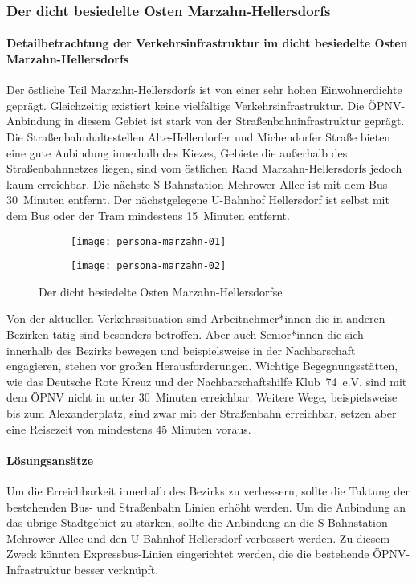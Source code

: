 \subsubsection{Der dicht besiedelte Osten Marzahn-Hellersdorfs}
\paragraph{Detailbetrachtung der Verkehrsinfrastruktur im dicht besiedelte Osten Marzahn-Hellersdorfs}
Der östliche Teil Marzahn-Hellersdorfs ist von einer sehr hohen Einwohnerdichte geprägt. Gleichzeitig existiert keine vielfältige Verkehrsinfrastruktur. Die ÖPNV-Anbindung in diesem Gebiet ist stark von der Straßenbahninfrastruktur geprägt. Die Straßenbahnhaltestellen Alte-Hellerdorfer und Michendorfer Straße bieten eine gute Anbindung innerhalb des Kiezes, Gebiete die außerhalb des Straßenbahnnetzes liegen, sind vom östlichen Rand Marzahn-Hellersdorfs jedoch kaum erreichbar. Die nächste S-Bahnstation Mehrower Allee ist mit dem Bus 30~Minuten entfernt. Der nächstgelegene U-Bahnhof Hellersdorf ist selbst mit dem Bus oder der Tram mindestens 15~Minuten entfernt.

\begin{figure}
    \centering
    \begin{subfigure}{.5\textwidth}
        \centering
        \texttt{[image: persona-marzahn-01]}
    \end{subfigure}%
    \begin{subfigure}{.5\textwidth}
        \centering
        \texttt{[image: persona-marzahn-02]}
    \end{subfigure}
    \caption{Der dicht besiedelte Osten Marzahn-Hellersdorfse}
    \label{persona-marzahn-hellersdorf}
\end{figure}

Von der aktuellen Verkehrssituation sind Arbeitnehmer*innen die in anderen Bezirken tätig sind besonders betroffen. Aber auch Senior*innen die sich innerhalb des Bezirks bewegen und beispielsweise in der Nachbarschaft engagieren, stehen vor großen Herausforderungen. Wichtige Begegnungsstätten, wie das Deutsche Rote Kreuz und der Nachbarschaftshilfe Klub~74~e.V. sind mit dem ÖPNV nicht in unter 30~Minuten erreichbar. Weitere Wege, beispielsweise bis zum Alexanderplatz, sind zwar mit der Straßenbahn erreichbar, setzen aber eine Reisezeit von mindestens 45 Minuten voraus.

\paragraph{Lösungsansätze}
Um die Erreichbarkeit innerhalb des Bezirks zu verbessern, sollte die Taktung der bestehenden Bus- und Straßenbahn Linien erhöht werden. Um die Anbindung an das übrige Stadtgebiet zu stärken, sollte die Anbindung an die S-Bahnstation Mehrower Allee und den U-Bahnhof Hellersdorf verbessert werden. Zu diesem Zweck könnten Expressbus-Linien eingerichtet werden, die die bestehende ÖPNV-Infrastruktur besser verknüpft.

